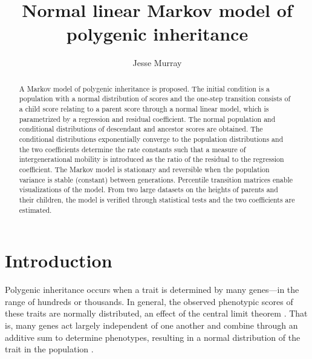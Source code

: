 \documentclass{svproc} %
\begin{document}
\mainmatter              %

\title{Normal linear Markov model of\\polygenic inheritance}

\author{Jesse Murray}



\maketitle   %

\begin{abstract} %
A Markov model of polygenic inheritance is proposed. The initial condition is a population with a normal distribution of scores and the one-step transition consists of a child score relating to a parent score through a normal linear model, which is parametrized by a regression and residual coefficient. The normal population and conditional distributions of descendant and ancestor scores are obtained. The conditional distributions exponentially converge to the population distributions and the two coefficients determine the rate constants such that a measure of intergenerational mobility is introduced as the ratio of the residual to the regression coefficient. The Markov model is stationary and reversible when the population variance is stable (constant) between generations. Percentile transition matrices enable visualizations of the model. From two large datasets on the heights of parents and their children, the model is verified through statistical tests and the two coefficients are estimated.
%
\end{abstract}



\section{Introduction}

Polygenic inheritance occurs when a trait is determined by many genes---in the range of hundreds or thousands. In general, the observed phenotypic scores of these traits are normally distributed, an effect of the central limit theorem \cite{rieger, lange_article}. That is, many genes act largely independent of one another and combine through an additive sum to determine phenotypes, resulting in a normal distribution of the trait in the population \cite{lange_book}. 
\end{document}
